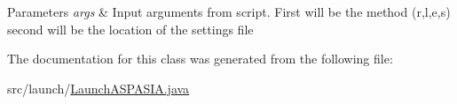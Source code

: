 \begin{DoxyParams}{Parameters}
{\em args} & Input arguments from script. First will be the method (r,l,e,s) second will be the location of the settings file \\
\hline
\end{DoxyParams}


The documentation for this class was generated from the following file\+:\begin{DoxyCompactItemize}
\item 
src/launch/\hyperlink{LaunchASPASIA_8java}{Launch\+A\+S\+P\+A\+S\+I\+A.\+java}\end{DoxyCompactItemize}
